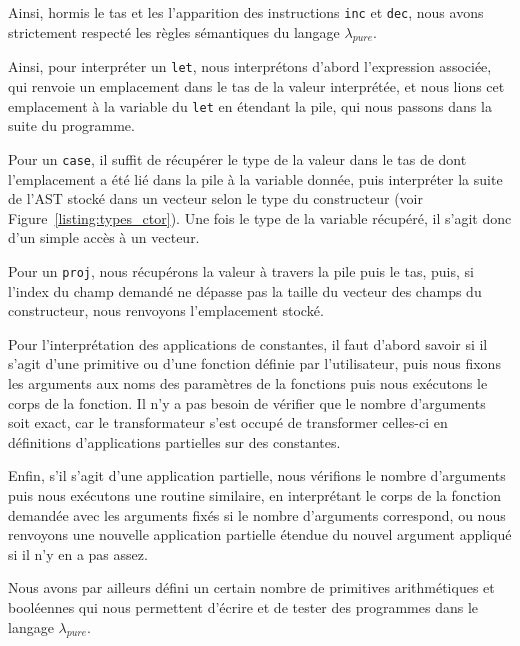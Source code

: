 \documentclass{rapportECL}
\begin{document}
Ainsi, hormis le tas et les l'apparition des instructions \verb|inc| et \verb|dec|, nous avons strictement respecté les 
règles sémantiques du langage $\lambda_{pure}$.

\medskip

Ainsi, pour interpréter un \verb|let|, nous interprétons d'abord l'expression associée, qui renvoie un emplacement dans le tas
de la valeur interprétée, et nous lions cet emplacement à la variable du \verb|let| en étendant la pile, qui nous passons dans 
la suite du programme.

\medskip

Pour un \verb|case|, il suffit de récupérer le type de la valeur dans le tas de dont l'emplacement a été lié dans la pile à la variable 
donnée, puis interpréter la suite de l'AST stocké dans un vecteur selon le type du constructeur (voir Figure~\ref{listing:types_ctor}).
Une fois le type de la variable récupéré, il s'agit donc d'un simple accès à un vecteur.

\medskip

Pour un \verb|proj|, nous récupérons la valeur à travers la pile puis le tas, puis, si l'index du champ demandé ne dépasse pas la 
taille du vecteur des champs du constructeur, nous renvoyons l'emplacement stocké.

\medskip

Pour l'interprétation des applications de constantes, il faut d'abord savoir si il s'agit d'une primitive ou d'une fonction 
définie par l'utilisateur, puis nous fixons les arguments aux noms des paramètres de la fonctions puis nous exécutons le corps de la fonction.
Il n'y a pas besoin de vérifier que le nombre d'arguments soit exact, car le transformateur s'est occupé de transformer celles-ci
en définitions d'applications partielles sur des constantes.

\medskip

Enfin, s'il s'agit d'une application partielle, nous vérifions le nombre d'arguments puis nous exécutons une routine similaire,
en interprétant le corps de la fonction demandée avec les arguments fixés si le nombre d'arguments correspond, ou
nous renvoyons une nouvelle application partielle étendue du nouvel argument appliqué si il n'y en a pas assez.

\bigskip

Nous avons par ailleurs défini un certain nombre de primitives arithmétiques et booléennes qui nous permettent d'écrire et 
de tester des programmes dans le langage $\lambda_{pure}$.
\end{document}
